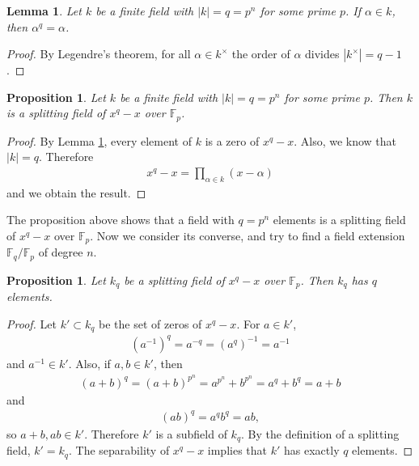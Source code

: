 \documentclass[12pt]{report}
\theoremstyle{plain}
\newtheorem{lemma}[theorem]{Lemma}
\newtheorem{proposition}[theorem]{Proposition}
\theoremstyle{remark}
\theoremstyle{definition}
\begin{document}
\begin{lemma}\label{Lemma 3.9.1.}
    Let $k$ be a finite field with $|k|=q=p^n$ for some prime $p$. If $\alpha\in k$, then $\alpha^q=\alpha$.
\end{lemma}
\begin{proof}
    By Legendre's theorem, for all $\alpha\in k^\times$ the order of $\alpha$ divides $|k^\times|=q-1$.
\end{proof}

\begin{proposition}
    Let $k$ be a finite field with $|k|=q=p^n$ for some prime $p$. Then $k$ is a splitting field of $x^q-x$ over $\mathbb{F}_p$.
\end{proposition}
\begin{proof}
    By Lemma \ref{Lemma 3.9.1.}, every element of $k$ is a zero of $x^q-x$. Also, we know that $|k|=q$. Therefore
    \begin{align*}
        x^q-x = \prod_{\alpha\in k}(x-\alpha)
    \end{align*}
    and we obtain the result.
\end{proof}

The proposition above shows that a field with $q=p^n$ elements is a splitting field of $x^q-x$ over $\mathbb{F}_p$. Now we consider its converse, and try to find a field extension $\mathbb{F}_q/\mathbb{F}_p$ of degree $n$.

\begin{proposition}
    Let $k_q$ be a splitting field of $x^q-x$ over $\mathbb{F}_p$. Then $k_q$ has $q$ elements.
\end{proposition}
\begin{proof}
    Let $k'\subset k_q$ be the set of zeros of $x^q-x$. For $a\in k'$,
    \begin{align*}
        (a^{-1})^q = a^{-q} = (a^q)^{-1} = a^{-1}
    \end{align*}
    and $a^{-1}\in k'$.
    Also, if $a,b\in k'$, then
    \begin{align*}
        (a+b)^q = (a+b)^{p^n} = a^{p^n}+b^{p^n} = a^q + b^q = a+b
    \end{align*}
    and
    \begin{align*}
        (ab)^q = a^q b^q = ab,
    \end{align*}
    so $a+b,ab\in k'$. Therefore $k'$ is a subfield of $k_q$. By the definition of a splitting field, $k'=k_q$. The separability of $x^q-x$ implies that $k'$ has exactly $q$ elements.
\end{proof}
\end{document}
